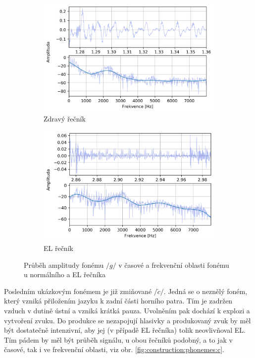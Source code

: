 \begin{figure}[htpb]
  \centering
  \begin{subfigure}[b]{0.45\textwidth}
    \includegraphics[width=\textwidth]{./ch5-construction/img/signal-normal_g.png}
    \caption{Zdravý řečník}
    \label{fig:construction:phonemes:g:normal}
  \end{subfigure}
  \begin{subfigure}[b]{0.45\textwidth}
    \includegraphics[width=\textwidth]{./ch5-construction/img/signal-el_g.png}
    \caption{EL řečník}
    \label{fig:construction:phonemes:g:el}
  \end{subfigure}
  \caption{Průběh amplitudy fonému $/g/$ v časové a frekvenční oblasti fonému u normálního a EL řečníka}
  \label{fig:construction:phonemes:g}
\end{figure}

Posledním ukázkovým fonémem je již zmiňované $/\check{c}/$. Jedná se o neznělý foném, který vzniká přiložením jazyku k zadní části horního patra. Tím je zadržen vzduch v dutině ústní a vzniká krátká pauza. Uvolněním pak dochází k explozi a vytvoření zvuku. \cite{Psutka2006} Do produkce se nezapojují hlasivky a produkovaný zvuk by měl být dostatečně intenzivní, aby jej (v případě EL řečníka) tolik neovlivňoval EL. Tím pádem by měl být průběh signálu, u obou řečníků podobný, a to jak v časové, tak i ve frekvenční oblasti, viz obr. \ref{fig:construction:phonemes:c}.

